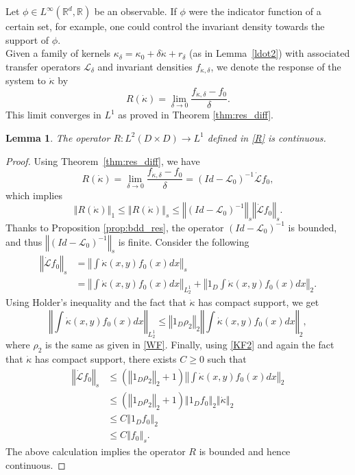\documentclass{amsart}
\newtheorem{lemma}[theorem]{Lemma}
\newcommand\cL{{\mathcal L}}
\newcommand\bR{{\mathbb R}}
\newcommand{\norm}[1]{\left\Vert#1\right\Vert}
\begin{document}
Let $\phi\in L^{\infty}(\bR^d,\mathbb{R})$ be an observable. If $\phi$ were the indicator function of  a certain set, for example, one could control the invariant density towards the support of $\phi$. \\
Given a family of kernels $\kappa_{\delta }=\kappa_0+\delta\dot{\kappa}+r_\delta$ (as in Lemma~\ref{ldot2}) with associated transfer operators \(\cL_\delta\) and invariant densities $f_{\dot{\kappa},\delta }$, we denote the response of the system to $\dot{\kappa}$ by 
\begin{equation}\label{R}
R(\dot{\kappa})=\lim\limits_{\delta \rightarrow 0}\frac{f _{\dot{\kappa},\delta}-f _{0}}{\delta }.
\end{equation}%
This limit converges in $L^{1}$ as proved in Theorem \ref{thm:res_diff}.
\begin{lemma}\label{lem:R_cty}
    The operator \(R:L^2(D\times D)\to L^1\) defined in \eqref{R} is continuous.
\end{lemma}
\begin{proof}

        Using Theorem~\ref{thm:res_diff}, we have 
    \[
    R(\dot{\kappa})=\lim\limits_{\delta \rightarrow 0}\frac{f _{\dot{\kappa},\delta}-f _{0}}{\delta }=(Id-\cL_0)^{-1}\dot{\cL}f_0,
    \]
   which implies 
    \[
    \norm{R(\dot{\kappa})}_{1}\leq \norm{R(\dot{\kappa})}_{s}\leq \norm{(Id-\cL_0)^{-1}}_{s}\norm{\dot\cL f_0}_{s}.
    \]
     Thanks to Proposition \ref{prop:bdd_res}, the operator $(Id- \mathcal{L}_0)^{-1}$ is bounded, and thus $\norm{(Id- \mathcal{L}_0)^{-1}}_s$ is finite. Consider the following 
    \[
    \begin{split}
        \norm{\dot\cL f_0}_{s}
        &= \norm{\int\dot \kappa(x,y)f_0(x)dx}_{s}\\
        &= \norm{\int\dot \kappa(x,y)f_0(x)dx}_{L^1_2}+\norm{1_D\int\dot \kappa(x,y)f_0(x)dx}_{2}.
    \end{split}
    \] 
    Using Holder's inequality and the fact that \(\dot \kappa\) has compact support, we get
    \[
    \norm{\int\dot \kappa(x,y)f_0(x)dx}_{L^1_2}\leq \norm{1_D\rho_2}_2\norm{\int\dot \kappa(x,y)f_0(x)dx}_{2},
    \]
    where \(\rho_2\) is the same as given in \eqref{WF}.
    Finally, using \eqref{KF2} and again the fact that \(\dot \kappa\) has compact support, there exists \(C\geq 0\) such that 
    \[
    \begin{split}
        \norm{\dot\cL f_0}_{s}
        &\leq (\norm{1_D\rho_2}_2+1)\norm{\int\dot \kappa(x,y)f_0(x)dx}_{2}\\
        &\leq (\norm{1_D\rho_2}_2+1) \norm{1_Df_0}_{2}\norm{\dot \kappa}_{2}\\
        &\leq C \norm{1_Df_0}_{2}\\
        &\leq C \norm{f_0}_s.
    \end{split}
    \]
     The above calculation implies the operator \(R\) is bounded and hence continuous.
\end{proof}
\end{document}
